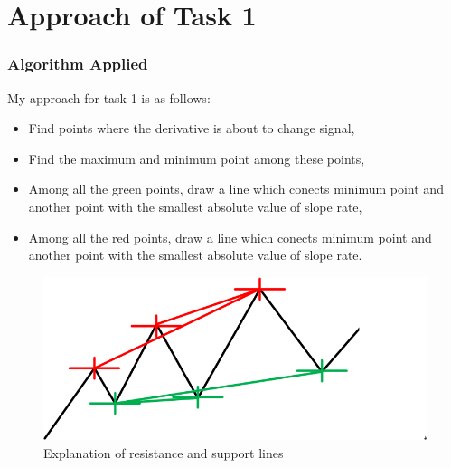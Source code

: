 \documentclass[compress,handout,10pt]{beamer}
\let\olditem\item
\renewcommand{\item}{\setlength{\itemsep}{0.5\baselineskip}\olditem}
\begin{document}
\section{Approach of Task 1}
\begin{frame}
\frametitle{Algorithm Applied}
My approach for task 1 is as follows:
\begin{itemize}
\item Find points where the  derivative is about to change signal,
\item Find the maximum and minimum point among these points,
\item Among all the green points, draw a line which conects minimum point and another point with the smallest absolute value of slope rate,
\item Among all the red points, draw a line which conects minimum point and another point with the smallest absolute value of slope rate.
\end{itemize}
\begin{figure}[h]
    \begin{center}
        \includegraphics[width=\textwidth]{images/5.png}
    \end{center}
    \caption{Explanation of resistance and support lines}
    \label{fig:ers}
\end{figure}
\end{frame}
\end{document}
